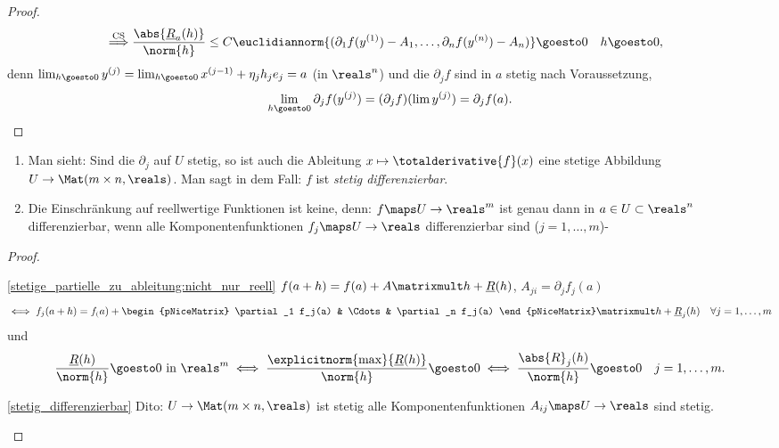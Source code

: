 \begin{proof}
\begin{align*}
        \overset{\text{CS}}{\implies}&\frac{\abs{\underline{R}_a(h)}}{\norm{h}}\leq C\euclidiannorm{(\partial_1 f(y^{(1)})-A_1,\dotsc,\partial_n f(y^{(n)})-A_n)}\goesto 0 \quad h\goesto 0,
    \end{align*}
    denn \( \lim_{h\goesto 0}y^{(j)}=\lim_{h\goesto 0}x^{(j-1)}+\eta_j h_j e_j=a \) (in \( \reals^n \)) und die \( \partial_j f \) sind in \( a \) stetig nach Voraussetzung, \sd
    \begin{align*}
        \lim_{h \goesto 0}\partial_j f(y^{(j)})=(\partial_j f)(\lim y^{(j)})=\partial_j f(a).
    \end{align*}
\end{proof}
\begin{bemerkungen}
    \begin{enumerate}
        \item \label{stetig_differenzierbar} Man sieht: Sind die \( \partial_j  \) auf \( U \) stetig, so ist auch die Ableitung \( x\mapsto \totalderivative{f}(x) \) eine stetige Abbildung \( U\to \Mat(m\times n, \reals) \). Man sagt in dem Fall: \( f \) ist \emph{stetig differenzierbar}.
        \item \label{stetige_partielle_zu_ableitung:nicht_nur_reell} Die Einschränkung auf reellwertige Funktionen ist keine, denn: \( f\maps U\to \reals^m \) ist genau dann in \( a\in U\subset \reals^n \) differenzierbar, wenn alle Komponentenfunktionen \( f_j\maps U\to \reals \) differenzierbar sind (\( j=1,\dotsc, m \))-
    \end{enumerate}
\end{bemerkungen}
\begin{proof}
    \begin{proofdescription}
        \item[\ref{stetige_partielle_zu_ableitung:nicht_nur_reell}] \( f(a+h)=f(a)+A\matrixmult h+\underline{R}(h) \), \( A_{ji}=\partial_j f_j(a) \) 
        \begin{equation*}
            \iff f_j(a+h)=f_(a)+\begin{pNiceMatrix} \partial_1 f_j(a) & \Cdots & \partial_n f_j(a) \end{pNiceMatrix}\matrixmult h+\underline{R}_j(h)\quad \forall j=1,\dotsc, m
        \end{equation*}
        und
        \begin{equation*}
            \frac{\underline{R}(h)}{\norm{h}}\goesto 0 \text{ in }\reals^m\iff \frac{\explicitnorm{\max}{\underline{R}(h)}}{\norm{h}}\goesto 0\iff \frac{\abs{R}_j(h)}{\norm{h}}\goesto 0\quad j=1,\dotsc,m.
        \end{equation*}
        \item[\ref{stetig_differenzierbar}] Dito: \( U\to \Mat(m\times n,\reals) \) ist stetig \tiff alle Komponentenfunktionen \( A_{ij}\maps U\to \reals \) sind stetig.
    \end{proofdescription}
    
\end{proof}
